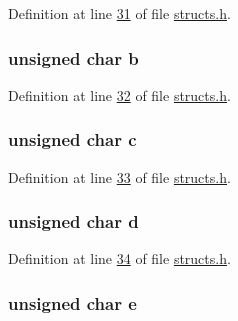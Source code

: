 Definition at line \hyperlink{structs_8h_source_l00031}{31} of file \hyperlink{structs_8h_source}{structs.\+h}.

\subsubsection[{\texorpdfstring{b}{b}}]{\setlength{\rightskip}{0pt plus 5cm}unsigned char b}\hypertarget{structsix__uchar_a41cede1b4c0d05cff170ad5761f70964}{}\label{structsix__uchar_a41cede1b4c0d05cff170ad5761f70964}


Definition at line \hyperlink{structs_8h_source_l00032}{32} of file \hyperlink{structs_8h_source}{structs.\+h}.

\subsubsection[{\texorpdfstring{c}{c}}]{\setlength{\rightskip}{0pt plus 5cm}unsigned char c}\hypertarget{structsix__uchar_a089aacf63ed94ae0e667bb8f6db3e853}{}\label{structsix__uchar_a089aacf63ed94ae0e667bb8f6db3e853}


Definition at line \hyperlink{structs_8h_source_l00033}{33} of file \hyperlink{structs_8h_source}{structs.\+h}.

\subsubsection[{\texorpdfstring{d}{d}}]{\setlength{\rightskip}{0pt plus 5cm}unsigned char d}\hypertarget{structsix__uchar_aef7bd9bb1f716afb151a4b4206d468f3}{}\label{structsix__uchar_aef7bd9bb1f716afb151a4b4206d468f3}


Definition at line \hyperlink{structs_8h_source_l00034}{34} of file \hyperlink{structs_8h_source}{structs.\+h}.

\subsubsection[{\texorpdfstring{e}{e}}]{\setlength{\rightskip}{0pt plus 5cm}unsigned char e}\hypertarget{structsix__uchar_a78b0af8eb57f2f240016ee37529c6f47}{}\label{structsix__uchar_a78b0af8eb57f2f240016ee37529c6f47}


